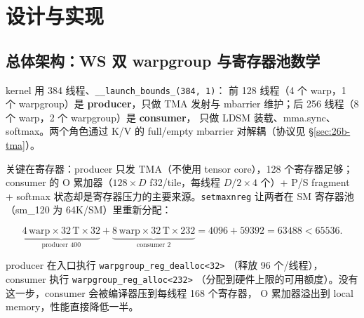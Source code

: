 \section{设计与实现}\label{sec:26b-design}

\subsection{总体架构：WS 双 warpgroup 与寄存器池数学}\label{sec:26b-arch}

kernel 用 384 线程、\texttt{\_\_launch\_\allowbreak{}bounds\_\allowbreak{}(384,~1)}：
前 128 线程（4 个 warp，1 个 warpgroup）是\textbf{ producer}，只做 TMA 发射与
mbarrier 维护；后 256 线程（8 个 warp，2 个 warpgroup）是\textbf{ consumer}，
只做 LDSM 装载、mma.sync、softmax。两个角色通过 K/V 的
full/empty mbarrier 对解耦（协议见 \S\ref{sec:26b-tma}）。

关键在寄存器：producer 只发 TMA（不使用 tensor core），128 个寄存器足够；
consumer 的 O 累加器（$128\times D$ f32/tile，每线程 $D/2{\times}4$ 个）+ P/S
fragment + softmax 状态却是寄存器压力的主要来源。\texttt{setmaxnreg} 让两者在
SM 寄存器池（sm\_120 为 64K/SM）里重新分配：

\begin{equation}\label{eq:26b-regpool}
  \underbrace{4\,\text{warp}\times 32\,\text{T}\times 32}_{\text{producer }400}
  + \underbrace{8\,\text{warp}\times 32\,\text{T}\times 232}_{\text{consumer }2}
  = 4096 + 59392 = 63488 < 65536 .
\end{equation}

producer 在入口执行 \texttt{warpgroup\_\allowbreak{}reg\_\allowbreak{}dealloc<32>}
（释放 96 个/线程），consumer 执行 \texttt{warpgroup\_\allowbreak{}reg\_\allowbreak{}alloc<232>}
（分配到硬件上限的可用额度）。没有这一步，consumer 会被编译器压到每线程 168 个寄存器，
O 累加器溢出到 local memory，性能直接降低一半。

